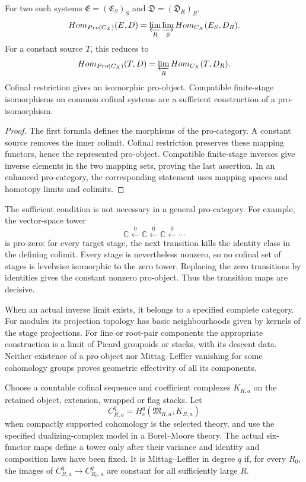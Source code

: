 \begin{proposition}
\label{prop:dirac-igusa-pro-object-universal-property}
For two such systems \(\mathfrak E=(\mathfrak E_S)_S\) and
\(\mathfrak D=(\mathfrak D_R)_R\),
\[
 \operatorname{Hom}_{\operatorname{Pro}(\mathsf C_X)}
       (\mathfrak E,\mathfrak D)
 =\varprojlim_R\varinjlim_S
       \operatorname{Hom}_{\mathsf C_X}(\mathfrak E_S,\mathfrak D_R).
\]
For a constant source \(T\), this reduces to
\[
 \operatorname{Hom}_{\operatorname{Pro}(\mathsf C_X)}(T,\mathfrak D)
 =\varprojlim_R\operatorname{Hom}_{\mathsf C_X}(T,\mathfrak D_R).
\]
Cofinal restriction gives an isomorphic pro-object. Compatible
finite-stage isomorphisms on common cofinal systems are a sufficient
construction of a pro-isomorphism.
\end{proposition}
\begin{proof}
The first formula defines the morphisms of the pro-category. A
constant source removes the inner colimit. Cofinal restriction
preserves these mapping functors, hence the represented pro-object.
Compatible finite-stage inverses give inverse elements in the two
mapping sets, proving the last assertion. In an enhanced
pro-category, the corresponding statement uses mapping spaces and
homotopy limits and colimits.
\end{proof}

The sufficient condition is not necessary in a general pro-category.
For example, the vector-space tower
\[
 \mathbb C\xleftarrow{0}\mathbb C\xleftarrow{0}\mathbb C
       \xleftarrow{0}\cdots
\]
is pro-zero: for every target stage, the next transition kills the
identity class in the defining colimit. Every stage is nevertheless
nonzero, so no cofinal set of stages is levelwise isomorphic to the
zero tower. Replacing the zero transitions by identities gives the
constant nonzero pro-object. Thus the transition maps are decisive.

When an actual inverse limit exists, it belongs to a specified
complete category. For modules its projection topology has basic
neighbourhoods given by kernels of the stage projections. For line
or root-pair components the appropriate construction is a limit of
Picard groupoids or stacks, with its descent data. Neither existence
of a pro-object nor Mittag--Leffler vanishing for some cohomology
groups proves geometric effectivity of all its components.

\begin{definition}
\label{def:moduli-cohomology-ml-datum}
Choose a countable cofinal sequence and coefficient complexes
\(K_{R,a}\) on the retained object, extension, wrapped or flag
stacks. Let
\[
 C^q_{R,a}=H_c^q(\mathfrak M_{R,a},K_{R,a})
\]
when compactly supported cohomology is the selected theory, and use
the specified dualizing-complex model in a Borel--Moore theory.
The actual six-functor maps define a tower only after their variance
and identity and composition laws have been fixed.
It is Mittag--Leffler in degree \(q\) if, for every \(R_0\), the
images of \(C^q_{R,a}\to C^q_{R_0,a}\) are constant for all
sufficiently large \(R\).
\end{definition}

